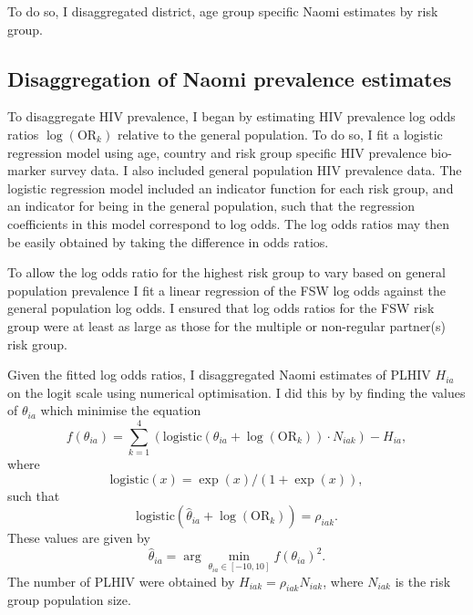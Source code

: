 \documentclass[a4paper, nobind]{templates/ociamthesis}
\begin{document}
To do so, I disaggregated district, age group specific Naomi estimates by risk group.

\hypertarget{disaggregation-of-naomi-prevalence-estimates}{%
\subsection{Disaggregation of Naomi prevalence estimates}\label{disaggregation-of-naomi-prevalence-estimates}}

To disaggregate HIV prevalence, I began by estimating HIV prevalence log odds ratios \(\log(\text{OR}_k)\) relative to the general population.
To do so, I fit a logistic regression model using age, country and risk group specific HIV prevalence bio-marker survey data.
I also included general population HIV prevalence data.
The logistic regression model included an indicator function for each risk group, and an indicator for being in the general population, such that the regression coefficients in this model correspond to log odds.
The log odds ratios may then be easily obtained by taking the difference in odds ratios.

To allow the log odds ratio for the highest risk group to vary based on general population prevalence I fit a linear regression of the FSW log odds against the general population log odds.
I ensured that log odds ratios for the FSW risk group were at least as large as those for the multiple or non-regular partner(s) risk group.

Given the fitted log odds ratios, I disaggregated Naomi estimates of PLHIV \(H_{ia}\) on the logit scale using numerical optimisation.
I did this by by finding the values of \(\theta_{ia}\) which minimise the equation
\begin{equation}
f(\theta_{ia}) = \sum_{k = 1}^4 \left( \text{logistic}(\theta_{ia} + \log(\text{OR}_k)) \cdot N_{iak} \right) - H_{ia},
\end{equation}
where
\begin{equation}
\text{logistic}(x) = \exp(x) / (1 + \exp(x)),
\end{equation}
such that
\begin{equation}
\text{logistic}(\hat \theta_{ia} + \log(\text{OR}_k)) = \rho_{iak}.
\end{equation}
These values are given by
\begin{equation}
\hat \theta_{ia} = \arg\min_{\theta_{ia} \in [-10, 10]} f(\theta_{ia})^2.
\end{equation}
The number of PLHIV were obtained by \(H_{iak} = \rho_{iak} N_{iak}\), where \(N_{iak}\) is the risk group population size.
\end{document}
